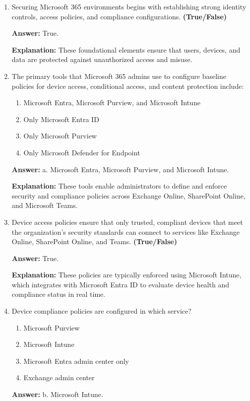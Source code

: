 \documentclass[10pt]{article}
\begin{document}
\begin{enumerate}[leftmargin=*]

\item Securing Microsoft 365 environments begins with establishing strong identity controls, access policies, and compliance configurations. \textbf{(True/False)}

\textbf{Answer:} True.

\textbf{Explanation:} These foundational elements ensure that users, devices, and data are protected against unauthorized access and misuse.

\item The primary tools that Microsoft 365 admins use to configure baseline policies for device access, conditional access, and content protection include:

\begin{enumerate}[label=\alph*., leftmargin=1.5em]
\item Microsoft Entra, Microsoft Purview, and Microsoft Intune
\item Only Microsoft Entra ID
\item Only Microsoft Purview
\item Only Microsoft Defender for Endpoint
\end{enumerate}
\textbf{Answer:} a. Microsoft Entra, Microsoft Purview, and Microsoft Intune.

\textbf{Explanation:} These tools enable administrators to define and enforce security and compliance policies across Exchange Online, SharePoint Online, and Microsoft Teams.

\item Device access policies ensure that only trusted, compliant devices that meet the organization’s security standards can connect to services like Exchange Online, SharePoint Online, and Teams. \textbf{(True/False)}

\textbf{Answer:} True.

\textbf{Explanation:} These policies are typically enforced using Microsoft Intune, which integrates with Microsoft Entra ID to evaluate device health and compliance status in real time.

\item Device compliance policies are configured in which service?
\begin{enumerate}[label=\alph*., leftmargin=1.5em]
\item Microsoft Purview
\item Microsoft Intune
\item Microsoft Entra admin center only
\item Exchange admin center
\end{enumerate}
\textbf{Answer:} b. Microsoft Intune.


\end{enumerate}
\end{document}
